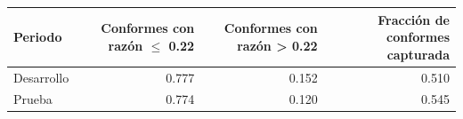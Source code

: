 \begin{tabular}{lrrr}
\toprule
Periodo & Conformes con razón $\le$ 0.22 & Conformes con razón > 0.22 & Fracción de conformes capturada \\
\midrule
Desarrollo & 0.777 & 0.152 & 0.510 \\
Prueba & 0.774 & 0.120 & 0.545 \\
\bottomrule
\end{tabular}
